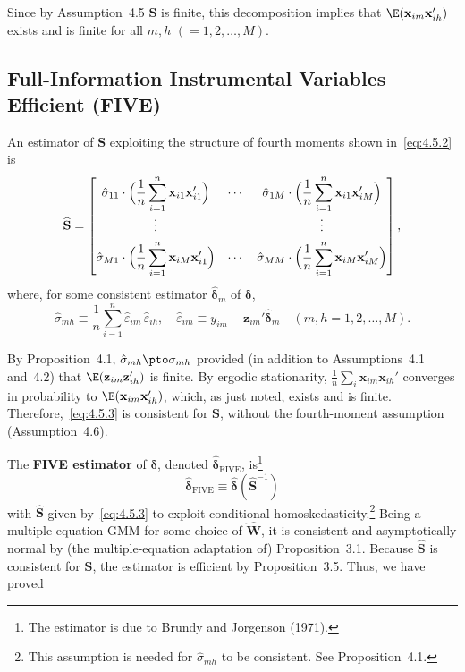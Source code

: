 Since by Assumption~4.5 $\mathbf{S}$ is finite, this decomposition implies that
$\E(\mathbf{x}_{im} \mathbf{x}_{ih}')$ exists and is finite for all
$m, h$ $(= 1, 2, \ldots, M)$.

\subsection*{Full-Information Instrumental Variables Efficient (FIVE)}

An estimator of $\mathbf{S}$ exploiting the structure of fourth moments shown
in~\eqref{eq:4.5.2} is
\begin{equation}
\widehat{\mathbf{S}} = \begin{bmatrix}
\hat{\sigma}_{11} \cdot \Bigl(\dfrac{1}{n} \displaystyle\sum_{i=1}^{n}
\mathbf{x}_{i1} \mathbf{x}_{i1}'\Bigr) & \cdots &
\hat{\sigma}_{1M} \cdot \Bigl(\dfrac{1}{n} \displaystyle\sum_{i=1}^{n}
\mathbf{x}_{i1} \mathbf{x}_{iM}'\Bigr) \\[8pt]
\vdots & & \vdots \\[4pt]
\hat{\sigma}_{M1} \cdot \Bigl(\dfrac{1}{n} \displaystyle\sum_{i=1}^{n}
\mathbf{x}_{iM} \mathbf{x}_{i1}'\Bigr) & \cdots &
\hat{\sigma}_{MM} \cdot \Bigl(\dfrac{1}{n} \displaystyle\sum_{i=1}^{n}
\mathbf{x}_{iM} \mathbf{x}_{iM}'\Bigr)
\end{bmatrix},
\label{eq:4.5.3}
\end{equation}
where, for some consistent estimator $\hat{\boldsymbol{\delta}}_m$ of $\boldsymbol{\delta}$,
\begin{equation}
\hat{\sigma}_{mh} \equiv \frac{1}{n} \sum_{i=1}^{n} \hat{\varepsilon}_{im}\, \hat{\varepsilon}_{ih},
\quad
\hat{\varepsilon}_{im} \equiv y_{im} - \mathbf{z}_{im}' \hat{\boldsymbol{\delta}}_m
\quad (m, h = 1, 2, \ldots, M).
\label{eq:4.5.4}
\end{equation}

By Proposition~4.1, $\hat{\sigma}_{mh} \pto \sigma_{mh}$ provided (in addition to
Assumptions~4.1 and~4.2) that $\E(\mathbf{z}_{im} \mathbf{z}_{ih}')$ is finite.
By ergodic stationarity,
$\frac{1}{n} \sum_i \mathbf{x}_{im} \mathbf{x}_{ih}'$ converges in probability to
$\E(\mathbf{x}_{im} \mathbf{x}_{ih}')$, which, as just noted, exists and is finite.
Therefore,~\eqref{eq:4.5.3} is consistent for $\mathbf{S}$, without the fourth-moment
assumption (Assumption~4.6).

The \textbf{FIVE estimator} of $\boldsymbol{\delta}$, denoted
$\hat{\boldsymbol{\delta}}_{\mathrm{FIVE}}$, is\footnote{The estimator is due to
Brundy and Jorgenson (1971).}
\[
\hat{\boldsymbol{\delta}}_{\mathrm{FIVE}}
\equiv \hat{\boldsymbol{\delta}}(\widehat{\mathbf{S}}^{-1})
\]
with $\widehat{\mathbf{S}}$ given by~\eqref{eq:4.5.3} to exploit conditional
homoskedasticity.\footnote{This assumption is needed for $\hat{\sigma}_{mh}$ to be
consistent. See Proposition~4.1.}
Being a multiple-equation GMM for some choice of $\hat{\mathbf{W}}$, it is consistent
and asymptotically normal by (the multiple-equation adaptation of)
Proposition~3.1. Because $\widehat{\mathbf{S}}$ is consistent for $\mathbf{S}$,
the estimator is efficient by Proposition~3.5. Thus, we have proved

